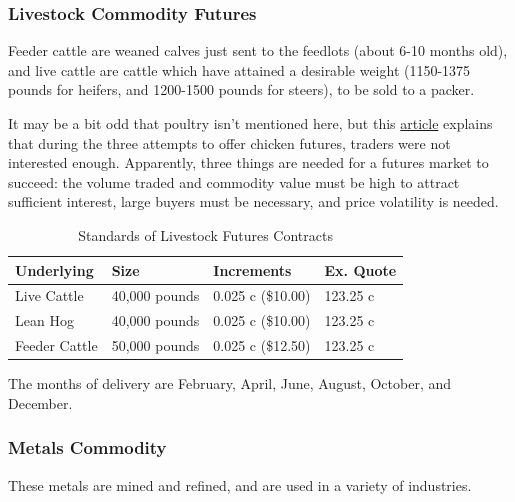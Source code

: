 \documentclass{article}
\begin{document}
    \subsubsection{Livestock Commodity Futures}

      Feeder cattle are weaned calves just sent to the feedlots (about 6-10 months old), and live cattle are cattle which have attained a desirable weight (1150-1375 pounds for heifers, and 1200-1500 pounds for steers), to be sold to a packer. 


      It may be a bit odd that poultry isn't mentioned here, but this \href{https://www.agiboo.com/chicken-as-a-commodity-the-reason-why-exchanges-dont-offer-options-and-futures/}{article} explains that during the three attempts to offer chicken futures, traders were not interested enough. Apparently, three things are needed for a futures market to succeed: the volume traded and commodity value must be high to attract sufficient interest, large buyers must be necessary, and price volatility is needed. 
    
      \begin{table}[H]
        \centering
        \begin{tabular}{|l|l|l|l|}
        \hline
        \textbf{Underlying} & \textbf{Size} & \textbf{Increments} & \textbf{Ex. Quote} \\ \hline
        Live Cattle & 40,000 pounds & 0.025 c (\$10.00) & 123.25 c\\ \hline
        Lean Hog & 40,000 pounds & 0.025 c (\$10.00) & 123.25 c\\ \hline 
        Feeder Cattle & 50,000 pounds & 0.025 c (\$12.50) & 123.25 c\\ \hline 
        \end{tabular}
        \caption{Standards of Livestock Futures Contracts}
        \label{tab:livestock}
      \end{table}

      The months of delivery are February, April, June, August, October, and December. 

    \subsubsection{Metals Commodity}

      These metals are mined and refined, and are used in a variety of industries. 
\end{document}
